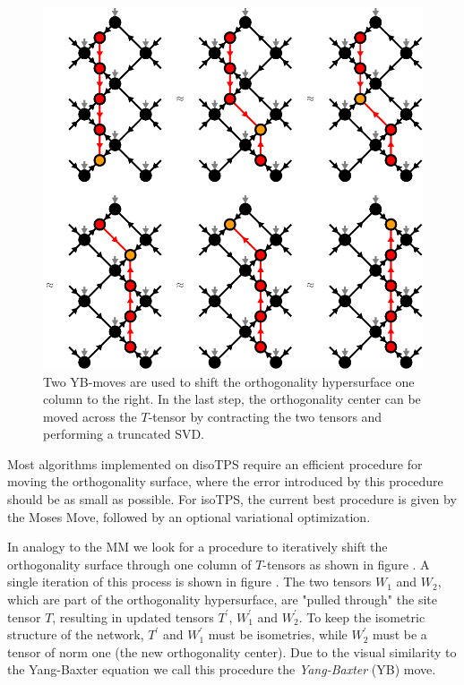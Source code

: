 \begin{figure}
	\centering
	\includegraphics[scale=1]{figures/tikz/disoTPS/shifting_ortho_surface/shifting_ortho_surface.pdf}
	\caption{Two YB-moves are used to shift the orthogonality hypersurface one column to the right. In the last step, the orthogonality center can be moved across the $T$-tensor by contracting the two tensors and performing a truncated SVD.}
	\label{fig:disoTPS_moving_ortho_surface}
\end{figure}
Most algorithms implemented on disoTPS require an efficient procedure for moving the orthogonality surface, where the error introduced by this procedure should be as small as possible. For isoTPS, the current best procedure is given by the Moses Move, followed by an optional variational optimization. \par
In analogy to the MM we look for a procedure to iteratively shift the orthogonality surface through one column of $T$-tensors as shown in figure . A single iteration of this process is shown in figure . The two tensors $W_1$ and $W_2$, which are part of the orthogonality hypersurface, are "pulled through" the site tensor $T$, resulting in updated tensors $T^\prime$, $W_1^\prime$ and $W_2^\prime$. To keep the isometric structure of the network, $T^\prime$ and $W_1^\prime$ must be isometries, while $W_2^\prime$ must be a tensor of norm one (the new orthogonality center). Due to the visual similarity to the Yang-Baxter equation we call this procedure the \textit{Yang-Baxter} (YB) move. \par
